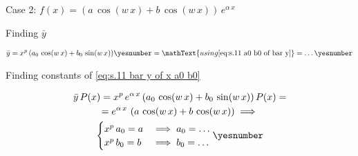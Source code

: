 \documentclass["AM3C-Slides_annotations.tex"]{subfiles}
\begin{document}
\begin{sectionBox}
  Case 2: \(f(x) = (a\,\cos(w\,x)+b\,\cos(w\,x))\,e^{\alpha\,x}\)
  \begin{tcolorbox}
    Finding \(\bar{y}\)
    \begin{tcolorbox}
      \begin{gather*}
        \bar{y}
        = x^p\,(
          a_0\,\cos(w\,x)
          + b_0\,\sin(w\,x)
        )
        \yesnumber\label{eq:s.11 bar y of x a0 b0}
        = \mathText{using \eqref{eq:s.11 a0 b0 of bar y}}
        = \dots
        \yesnumber\label{eq:s.11.2 bar y}
      \end{gather*}
    \end{tcolorbox}

    Finding constants of \eqref{eq:s.11 bar y of x a0 b0}
    \begin{tcolorbox}
      \begin{gather*}
        \bar{y}\,P(x)
        = x^p\,e^{\alpha\,x}\,(
          a_0\,\cos(w\,x)
          + b_0\,\sin(w\,x)
        )\,P(x)
        = \\
        = e^{\alpha\,x}\,\left(
          a\,\cos(w\,x)
          +b\,\cos(w\,x)
        \right)
        \implies \\
        \begin{cases}
          x^p\,a_0 = a 
          &\implies a_0 = \dots
          \\
          x^p\,b_0 = b
          & \implies
          b_0 = \dots
        \end{cases}
        \yesnumber\label{eq:s.11 a0 b0 of bar y}
      \end{gather*}
    \end{tcolorbox}
  \end{tcolorbox}


\end{sectionBox}
\end{document}

